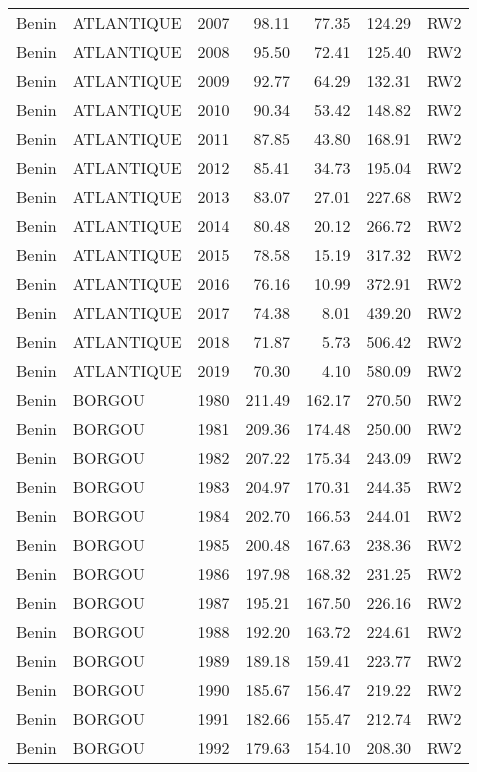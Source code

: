\begin{longtable}{lllrrrl}
  Benin & ATLANTIQUE & 2007 & 98.11 & 77.35 & 124.29 & RW2 \\ 
  Benin & ATLANTIQUE & 2008 & 95.50 & 72.41 & 125.40 & RW2 \\ 
  Benin & ATLANTIQUE & 2009 & 92.77 & 64.29 & 132.31 & RW2 \\ 
  Benin & ATLANTIQUE & 2010 & 90.34 & 53.42 & 148.82 & RW2 \\ 
  Benin & ATLANTIQUE & 2011 & 87.85 & 43.80 & 168.91 & RW2 \\ 
  Benin & ATLANTIQUE & 2012 & 85.41 & 34.73 & 195.04 & RW2 \\ 
  Benin & ATLANTIQUE & 2013 & 83.07 & 27.01 & 227.68 & RW2 \\ 
  Benin & ATLANTIQUE & 2014 & 80.48 & 20.12 & 266.72 & RW2 \\ 
  Benin & ATLANTIQUE & 2015 & 78.58 & 15.19 & 317.32 & RW2 \\ 
  Benin & ATLANTIQUE & 2016 & 76.16 & 10.99 & 372.91 & RW2 \\ 
  Benin & ATLANTIQUE & 2017 & 74.38 & 8.01 & 439.20 & RW2 \\ 
  Benin & ATLANTIQUE & 2018 & 71.87 & 5.73 & 506.42 & RW2 \\ 
  Benin & ATLANTIQUE & 2019 & 70.30 & 4.10 & 580.09 & RW2 \\ 
  Benin & BORGOU & 1980 & 211.49 & 162.17 & 270.50 & RW2 \\ 
  Benin & BORGOU & 1981 & 209.36 & 174.48 & 250.00 & RW2 \\ 
  Benin & BORGOU & 1982 & 207.22 & 175.34 & 243.09 & RW2 \\ 
  Benin & BORGOU & 1983 & 204.97 & 170.31 & 244.35 & RW2 \\ 
  Benin & BORGOU & 1984 & 202.70 & 166.53 & 244.01 & RW2 \\ 
  Benin & BORGOU & 1985 & 200.48 & 167.63 & 238.36 & RW2 \\ 
  Benin & BORGOU & 1986 & 197.98 & 168.32 & 231.25 & RW2 \\ 
  Benin & BORGOU & 1987 & 195.21 & 167.50 & 226.16 & RW2 \\ 
  Benin & BORGOU & 1988 & 192.20 & 163.72 & 224.61 & RW2 \\ 
  Benin & BORGOU & 1989 & 189.18 & 159.41 & 223.77 & RW2 \\ 
  Benin & BORGOU & 1990 & 185.67 & 156.47 & 219.22 & RW2 \\ 
  Benin & BORGOU & 1991 & 182.66 & 155.47 & 212.74 & RW2 \\ 
  Benin & BORGOU & 1992 & 179.63 & 154.10 & 208.30 & RW2 \\ 

\end{longtable}

